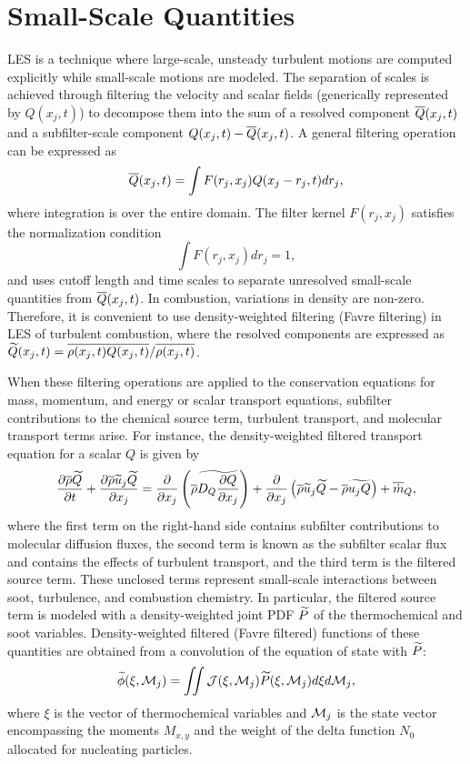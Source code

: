 \section{Small-Scale Quantities}
\label{sec:lesmodels:presumedpdf}

LES is a technique where large-scale, unsteady turbulent motions are computed explicitly while small-scale motions are modeled. The separation of scales is achieved through filtering the velocity and scalar fields (generically represented by $Q(x_j,t)$) to decompose them into the sum of a resolved component $\mean{Q}(x_j,t)$ and a subfilter-scale component $Q(x_j,t)-\mean{Q}(x_j,t)$. A general filtering operation can be expressed as
\begin{equation}\label{eq:lesmodels:presumedpdf:filter}
  \mean{Q}(x_j,t) = \int F(r_j,x_j)Q(x_j - r_j, t)dr_j,
\end{equation}
where integration is over the entire domain. The filter kernel $F(r_j,x_j)$ satisfies the normalization condition
\begin{equation}\label{eq:lesmodels:presumedpdf:kernel}
  \int F(r_j,x_j)dr_j = 1,
\end{equation}
and uses cutoff length and time scales to separate unresolved small-scale quantities from $\mean{Q}(x_j,t)$. In combustion, variations in density are non-zero. Therefore, it is convenient to use density-weighted filtering (Favre filtering) in LES of turbulent combustion, where the resolved components are expressed as $\tf{Q}(x_j,t) = \mean{\rho(x_j,t)Q(x_j,t)}/\mean{\rho(x_j,t)}$.

When these filtering operations are applied to the conservation equations for mass, momentum, and energy or scalar transport equations, subfilter contributions to the chemical source term, turbulent transport, and molecular transport terms arise. For instance, the density-weighted filtered transport equation for a scalar $Q$ is given by
\begin{equation}\label{eq:lesmodels:presumedpdf:scalar}
  \ftrder{\tf{Q}} = \pder[]{x_j}\left( \mean{\rho}\tf{D_Q\pder[Q]{x_j}} \right) + \dsff[\tf{Q}]{\tf{u_j Q}} + \fst[m]{Q},
\end{equation}
where the first term on the right-hand side contains subfilter contributions to molecular diffusion fluxes, the second term is known as the subfilter scalar flux and contains the effects of turbulent transport, and the third term is the filtered source term. These unclosed terms represent small-scale interactions between soot, turbulence, and combustion chemistry. In particular, the filtered source term is modeled with a density-weighted joint PDF $\tf{P}$ of the thermochemical and soot variables. Density-weighted filtered (Favre filtered) functions of these quantities are obtained from a convolution of the equation of state with $\tf{P}$:
\begin{equation}\label{eq:lesmodels:presumedpdf:filteredfuncs}
  \tf{\phi}(\xi,\mc{M}_j) = \iint \mc{J}(\xi,\mc{M}_j)\tf{P}(\xi,\mc{M}_j) d\xi d\mc{M}_j,
\end{equation}
where $\xi$ is the vector of thermochemical variables and $\mc{M}_j$ is the state vector encompassing the moments $M_{x,y}$ and the weight of the delta function $N_0$ allocated for nucleating particles.

